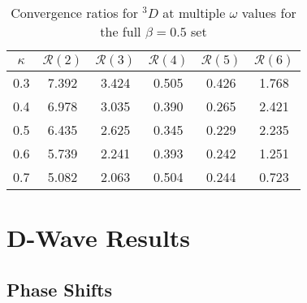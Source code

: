 \documentclass[Dissertation.tex]{subfiles}
\begin{document}
\begin{table}[H]
\centering
\begin{tabular}{cccccc}
\toprule
$\kappa$ & $\mathcal{R}(2)$ & $\mathcal{R}(3)$ & $\mathcal{R}(4)$ & $\mathcal{R}(5)$ & $\mathcal{R}(6)$ \\
\midrule
0.3 & 7.392 & 3.424 & 0.505 & 0.426 & 1.768 \\
0.4 & 6.978 & 3.035 & 0.390 & 0.265 & 2.421 \\
0.5 & 6.435 & 2.625 & 0.345 & 0.229 & 2.235 \\
0.6 & 5.739 & 2.241 & 0.393 & 0.242 & 1.251 \\
0.7 & 5.082 & 2.063 & 0.504 & 0.244 & 0.723 \\
\bottomrule
\end{tabular}
\caption{Convergence ratios for $^3D$ at multiple $\omega$ values for the full $\beta = 0.5$ set}
\label{tab:D3Beta5VarConv}
\end{table}



\section{D-Wave Results}
\label{sec:DWaveResults}

\subsection{Phase Shifts}
\label{sec:DWavePhase}
\end{document}
